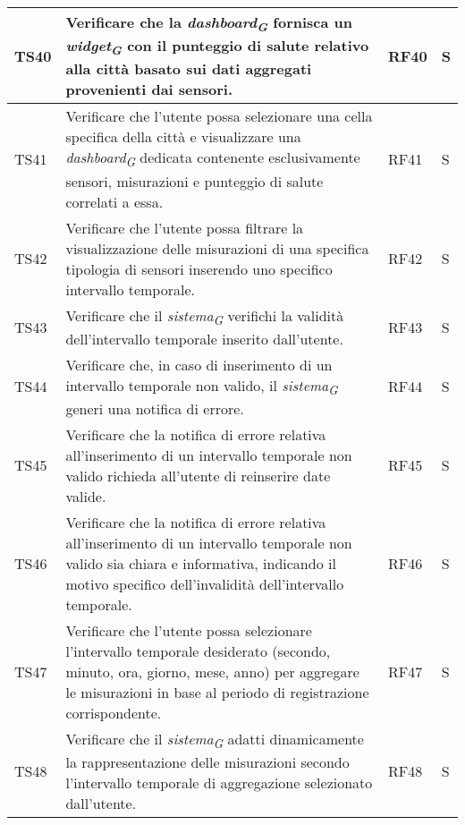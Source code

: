 \begin{longtable}{|C{1.9cm}|L{5cm}|C{2cm}|C{2cm}|}
    TS40 & Verificare che la \textit{dashboard}\textsubscript{\textit{G}} fornisca un \textit{widget}\textsubscript{\textit{G}} con il punteggio di salute relativo alla città basato sui dati aggregati provenienti dai sensori. & RF40 & S \\
    \hline

    TS41 & Verificare che l'utente possa selezionare una cella specifica della città e visualizzare una \textit{dashboard}\textsubscript{\textit{G}} dedicata contenente esclusivamente sensori, misurazioni e punteggio di salute correlati a essa. & RF41 & S \\
    \hline

    TS42 & Verificare che l'utente possa filtrare la visualizzazione delle misurazioni di una specifica tipologia di sensori inserendo uno specifico intervallo temporale. & RF42 & S \\
    \hline

    TS43 & Verificare che il \textit{sistema}\textsubscript{\textit{G}} verifichi la validità dell'intervallo temporale inserito dall'utente. & RF43 & S \\
    \hline

    TS44 & Verificare che, in caso di inserimento di un intervallo temporale non valido, il \textit{sistema}\textsubscript{\textit{G}} generi una notifica di errore. & RF44 & S \\
    \hline

    TS45 & Verificare che la notifica di errore relativa all'inserimento di un intervallo temporale non valido richieda all'utente di reinserire date valide. & RF45 & S \\
    \hline

    TS46 & Verificare che la notifica di errore relativa all'inserimento di un intervallo temporale non valido sia chiara e informativa, indicando il motivo specifico dell'invalidità dell'intervallo temporale. & RF46 & S \\
    \hline

    TS47 & Verificare che l'utente possa selezionare l'intervallo temporale desiderato (secondo, minuto, ora, giorno, mese, anno) per aggregare le misurazioni in base al periodo di registrazione corrispondente. & RF47 & S \\
    \hline

    TS48 & Verificare che il \textit{sistema}\textsubscript{\textit{G}} adatti dinamicamente la rappresentazione delle misurazioni secondo l'intervallo temporale di aggregazione selezionato dall'utente. & RF48 & S \\
    \hline


\end{longtable}
